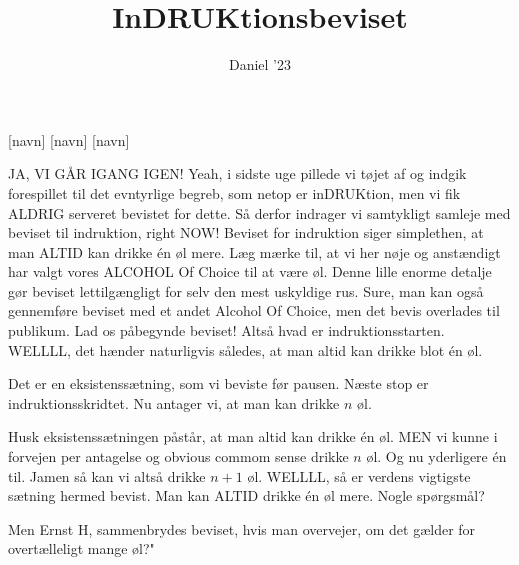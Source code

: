 \documentclass{article}
\title{InDRUKtionsbeviset}
\author{Daniel '23}
\begin{document}
\maketitle

\begin{roles}
    [navn]
    [navn]
    [navn]
\end{roles}

\begin{sketch}

     JA, VI GÅR IGANG IGEN!
     Yeah, i sidste uge pillede vi tøjet af og indgik forespillet til det evntyrlige begreb, som netop er inDRUKtion, men vi fik ALDRIG serveret bevistet for dette. Så derfor indrager vi samtykligt samleje med beviset til indruktion, right NOW! Beviset for indruktion siger simplethen, at man ALTID kan drikke én øl mere. Læg mærke til, at vi her nøje og anstændigt har valgt vores ALCOHOL Of Choice til at være øl. Denne lille enorme detalje gør beviset lettilgængligt for selv den mest uskyldige rus. Sure, man kan også gennemføre beviset med et andet Alcohol Of Choice, men det bevis overlades til publikum. Lad os påbegynde beviset! Altså hvad er indruktionsstarten. WELLLL, det hænder naturligvis således, at man altid kan drikke blot én øl.


     Det er en eksistenssætning, som vi beviste før pausen. Næste stop er indruktionsskridtet. Nu antager vi, at man kan drikke $n$ øl. 
    

      Husk eksistenssætningen påstår, at man altid kan drikke én øl. MEN vi kunne i forvejen per antagelse og obvious commom sense drikke $n$ øl. Og nu yderligere én til. Jamen så kan vi altså drikke $n+1$ øl. WELLLL, så er verdens vigtigste sætning hermed bevist. Man kan ALTID drikke én øl mere. Nogle spørgsmål?

      Men Ernst H, sammenbrydes beviset, hvis man overvejer, om det gælder for overtælleligt mange øl?"


\end{sketch}
\end{document}

